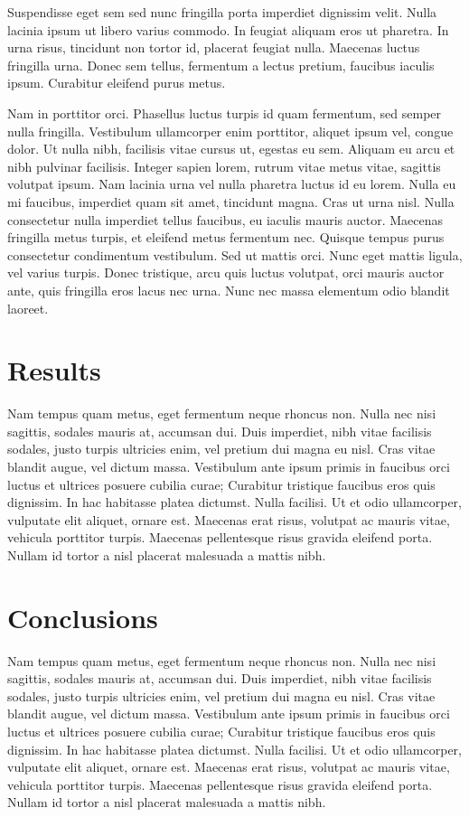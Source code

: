 \documentclass[12pt, letterpaper]{article}
\begin{document}
\newline
Suspendisse eget sem sed nunc fringilla porta imperdiet dignissim velit. Nulla lacinia ipsum ut libero varius commodo. In feugiat aliquam eros ut pharetra. In urna risus, tincidunt non tortor id, placerat feugiat nulla. Maecenas luctus fringilla urna. Donec sem tellus, fermentum a lectus pretium, faucibus iaculis ipsum. Curabitur eleifend purus metus.

Nam in porttitor orci. Phasellus luctus turpis id quam fermentum, sed semper nulla fringilla. Vestibulum ullamcorper enim porttitor, aliquet ipsum vel, congue dolor. Ut nulla nibh, facilisis vitae cursus ut, egestas eu sem. Aliquam eu arcu et nibh pulvinar facilisis. Integer sapien lorem, rutrum vitae metus vitae, sagittis volutpat ipsum. Nam lacinia urna vel nulla pharetra luctus id eu lorem. Nulla eu mi faucibus, imperdiet quam sit amet, tincidunt magna. Cras ut urna nisl. Nulla consectetur nulla imperdiet tellus faucibus, eu iaculis mauris auctor. Maecenas fringilla metus turpis, et eleifend metus fermentum nec. Quisque tempus purus consectetur condimentum vestibulum. Sed ut mattis orci. Nunc eget mattis ligula, vel varius turpis. Donec tristique, arcu quis luctus volutpat, orci mauris auctor ante, quis fringilla eros lacus nec urna. Nunc nec massa elementum odio blandit laoreet.

\section{Results}

\newline
Nam tempus quam metus, eget fermentum neque rhoncus non. Nulla nec nisi sagittis, sodales mauris at, accumsan dui. Duis imperdiet, nibh vitae facilisis sodales, justo turpis ultricies enim, vel pretium dui magna eu nisl. Cras vitae blandit augue, vel dictum massa. Vestibulum ante ipsum primis in faucibus orci luctus et ultrices posuere cubilia curae; Curabitur tristique faucibus eros quis dignissim. In hac habitasse platea dictumst. Nulla facilisi. Ut et odio ullamcorper, vulputate elit aliquet, ornare est. Maecenas erat risus, volutpat ac mauris vitae, vehicula porttitor turpis. Maecenas pellentesque risus gravida eleifend porta. Nullam id tortor a nisl placerat malesuada a mattis nibh.

\section{Conclusions}

\newline
Nam tempus quam metus, eget fermentum neque rhoncus non. Nulla nec nisi sagittis, sodales mauris at, accumsan dui. Duis imperdiet, nibh vitae facilisis sodales, justo turpis ultricies enim, vel pretium dui magna eu nisl. Cras vitae blandit augue, vel dictum massa. Vestibulum ante ipsum primis in faucibus orci luctus et ultrices posuere cubilia curae; Curabitur tristique faucibus eros quis dignissim. In hac habitasse platea dictumst. Nulla facilisi. Ut et odio ullamcorper, vulputate elit aliquet, ornare est. Maecenas erat risus, volutpat ac mauris vitae, vehicula porttitor turpis. Maecenas pellentesque risus gravida eleifend porta. Nullam id tortor a nisl placerat malesuada a mattis nibh.
\end{document}
